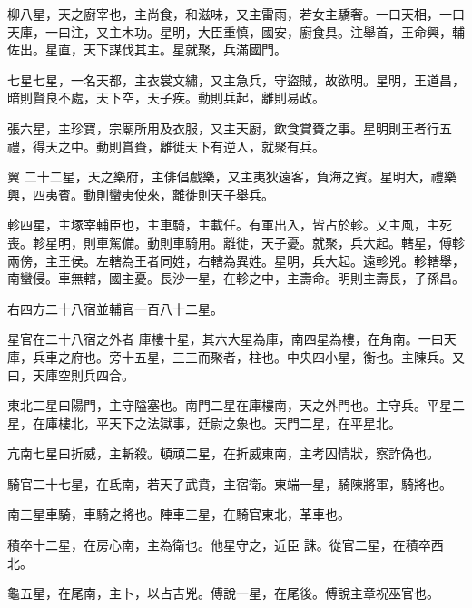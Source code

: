 \begin{pinyinscope}
 柳八星，天之廚宰也，主尚食，和滋味，又主雷雨，若女主驕奢。一曰天相，一曰天庫，一曰注，又主木功。星明，大臣重慎，國安，廚食具。注舉首，王命興，輔佐出。星直，天下謀伐其主。星就聚，兵滿國門。



 七星七星，一名天都，主衣裳文繡，又主急兵，守盜賊，故欲明。星明，王道昌，暗則賢良不處，天下空，天子疾。動則兵起，離則易政。



 張六星，主珍寶，宗廟所用及衣服，又主天廚，飲食賞賚之事。星明則王者行五禮，得天之中。動則賞賚，離徙天下有逆人，就聚有兵。



 翼
 二十二星，天之樂府，主俳倡戲樂，又主夷狄遠客，負海之賓。星明大，禮樂興，四夷賓。動則蠻夷使來，離徙則天子舉兵。



 軫四星，主塚宰輔臣也，主車騎，主載任。有軍出入，皆占於軫。又主風，主死喪。軫星明，則車駕備。動則車騎用。離徙，天子憂。就聚，兵大起。轄星，傅軫兩傍，主王侯。左轄為王者同姓，右轄為異姓。星明，兵大起。遠軫兇。軫轄舉，南蠻侵。車無轄，國主憂。長沙一星，在軫之中，主壽命。明則主壽長，子孫昌。



 右四方二十八宿並輔官一百八十二星。



 星官在二十八宿之外者
 庫樓十星，其六大星為庫，南四星為樓，在角南。一曰天庫，兵車之府也。旁十五星，三三而聚者，柱也。中央四小星，衡也。主陳兵。又曰，天庫空則兵四合。



 東北二星曰陽門，主守隘塞也。南門二星在庫樓南，天之外門也。主守兵。平星二星，在庫樓北，平天下之法獄事，廷尉之象也。天門二星，在平星北。



 亢南七星曰折威，主斬殺。頓頑二星，在折威東南，主考囚情狀，察詐偽也。



 騎官二十七星，在氐南，若天子武賁，主宿衛。東端一星，騎陳將軍，騎將也。



 南三星車騎，車騎之將也。陣車三星，在騎官東北，革車也。



 積卒十二星，在房心南，主為衛也。他星守之，近臣
 誅。從官二星，在積卒西北。



 龜五星，在尾南，主卜，以占吉兇。傅說一星，在尾後。傅說主章祝巫官也。




\end{pinyinscope}
